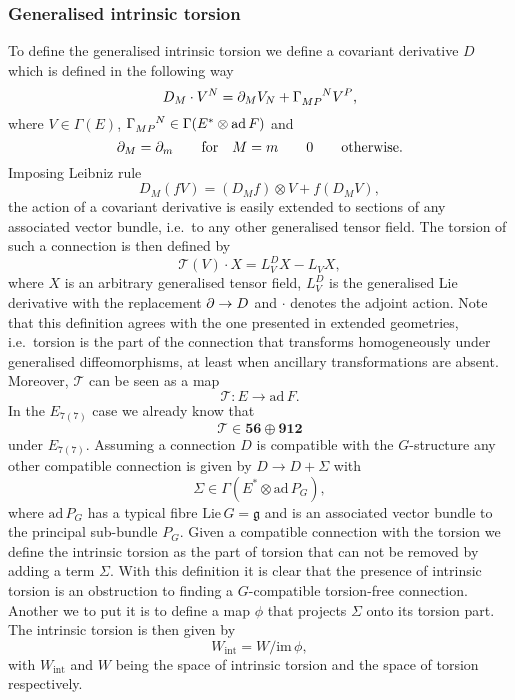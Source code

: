 \subsubsection{Generalised intrinsic torsion}
To define the generalised intrinsic torsion we define a covariant derivative $D$ which is defined in the following way 
\begin{equation}
    D_M\cdot V^N = \pd_MV_N+\tensor{\Gamma}{_M_P^N}V^P,
\end{equation}
where $V\in\Gamma(E)$, $\tensor{\Gamma}{_{MP}^N}\in\Gamma(E^*\otimes \text{ad}\,F)$ and 
\begin{equation}
    \partial_M = \partial_m \qquad \text{for} \quad M=m\qquad 0\qquad \text{otherwise}.
\end{equation}
Imposing Leibniz rule 
\begin{equation}
    D_M(fV) = (D_Mf)\otimes V+f(D_MV),
\end{equation}
the action of a covariant derivative is easily extended to sections of any associated vector bundle, i.e.\ to any other generalised tensor field. The torsion of such a connection is then defined by 
\begin{equation}
    \mathscr{T}(V)\cdot X = L_V^D X-L_V X,
\end{equation}
where $X$ is an arbitrary generalised tensor field, $L_V^D$ is the generalised Lie derivative with the replacement $\partial\to D$ and $\cdot$ denotes the adjoint action. Note that this definition agrees with the one presented in extended geometries, i.e.\ torsion is the part of the connection that transforms homogeneously under generalised diffeomorphisms, at least when ancillary transformations are absent. Moreover, $\mathscr{T}$ can be seen as a map
\begin{equation}
    \mathscr{T}: E\to \text{ad}\, F. 
\end{equation}
In the $E_{7(7)}$ case we already know that 
\begin{equation}
    \mathscr{T}\in \mathbf{56}\oplus\mathbf{912}
\end{equation}
under $E_{7(7)}$. Assuming a connection $D$ is compatible with the $G$-structure any other compatible connection is given by $D\to D+\Sigma$ with 
\begin{equation}
    \Sigma \in \Gamma(E^*\otimes \text{ad}\,P_G),
\end{equation}
where $\text{ad}\,P_G$ has a typical fibre $\text{Lie}\,G=\mathfrak{g}$ and is an associated vector bundle to the principal sub-bundle $P_G$. Given a compatible connection with the torsion we define the intrinsic torsion as the part of torsion that can not be removed by adding a term $\Sigma$. With this definition it is clear that the presence of intrinsic torsion is an obstruction to finding a $G$-compatible torsion-free connection. Another we to put it is to define a map $\phi$ that projects $\Sigma$ onto its torsion part. The intrinsic torsion is then given by 
\begin{equation}
    W_{\text{int}} = W/\text{im}\,\phi,
\end{equation}
with $W_{\text{int}}$ and $W$ being the space of intrinsic torsion and the space of torsion respectively. 

